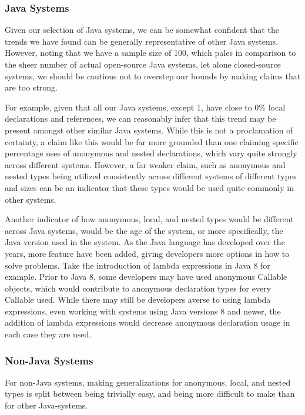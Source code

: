 \documentclass[12p]{article}
\begin{document}
\subsubsection{Java Systems}

Given our selection of Java systems, we can be somewhat confident that the trends we have found can be generally representative of other Java systems. However, noting that we have a sample size of 100, which pales in comparison to the sheer number of actual open-source Java systems, let alone closed-source systems, we should be cautious not to overstep our bounds by making claims that are too strong.

For example, given that all our Java systems, except 1, have close to 0\% local declarations and references, we can reasonably infer that this trend may be present amongst other similar Java systems. While this is not a proclamation of certainty, a claim like this would be far more grounded than one claiming specific percentage uses of anonymous and nested declarations, which vary quite strongly across different systems. However, a far weaker claim, such as anonymous and nested types being utilized consistently across different systems of different types and sizes can be an indicator that these types would be used quite commonly in other systems.

Another indicator of how anonymous, local, and nested types would be different across Java systems, would be the age of the system, or more specifically, the Java version used in the system. As the Java language has developed over the years, more feature have been added, giving developers more options in how to solve problems. Take the introduction of lambda expressions in Java 8 for example. Prior to Java 8, some developers may have used anonymous Callable objects, which would contribute to anonymous declaration types for every Callable used. While there may still be developers averse to using lambda expressions, even working with systems using Java versions 8 and newer, the addition of lambda expressions would decrease anonymous declaration usage in each case they are used.


\subsubsection{Non-Java Systems}

For non-Java systems, making generalizations for anonymous, local, and nested types is split between being trivially easy, and being more difficult to make than for other Java-systems.
\end{document}
